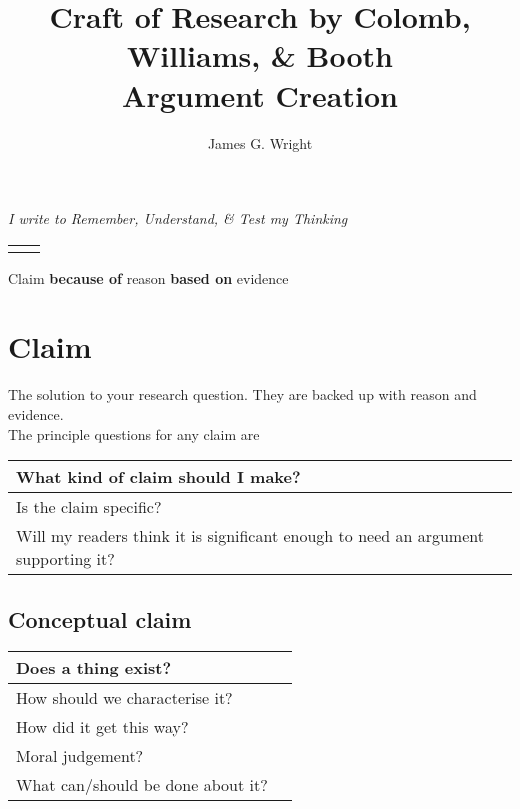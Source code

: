 \documentclass[10pt, a4paper]{article}
\begin{document}
	\title{Craft of Research by Colomb, Williams, \& Booth\cite{booth2009craft}
		\\Argument Creation}
	\author{James G. Wright }
	\maketitle
	\begin{center}
		\emph{I write to Remember, Understand, \& Test my Thinking}
	\end{center}
	
	\newpage
	\begin{center}
		\begin{tabular}{|l |l|}
			\hline
			&\\
		\end{tabular}
	\end{center}
	Claim \textbf{because of} reason \textbf{based on} evidence
	\section{Claim}
	The solution to your research question. They are backed up with reason and evidence.\\
	The principle questions for any claim are
	\begin{center}
		\begin{tabular}{|l |l|}
			\hline
			What kind of claim should I make? &\\
			\hline
			Is the claim specific? &\\
			\hline
			Will my readers think it is significant enough to need an argument supporting it? &\\
			\hline
		\end{tabular}
	\end{center}
	\subsection{Conceptual claim}
	\begin{center}
		\begin{tabular}{|l |l|}
			\hline
			Does a thing exist? &\\
			\hline
			How should we characterise it? &\\
			\hline
			How did it get this way?&\\
			\hline
			Moral judgement?&\\
			\hline
			What can/should be done about it?&\\
			\hline
		\end{tabular}
	\end{center}
\end{document}
